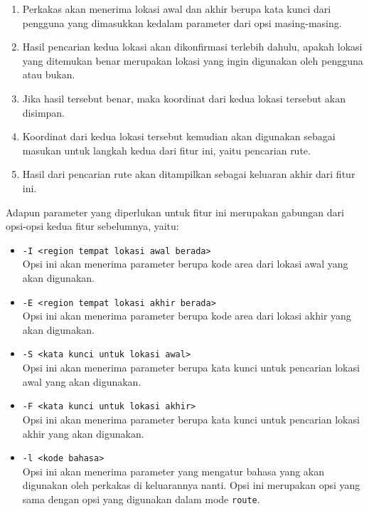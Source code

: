 \documentclass[a4paper,twoside]{article}
\begin{document}
\begin{enumerate}
\begin{itemize}
\begin{itemize}
		\begin{enumerate}
			\item Perkakas akan menerima lokasi awal dan akhir berupa kata kunci dari pengguna yang dimasukkan kedalam parameter dari opsi masing-masing.
			\item Hasil pencarian kedua lokasi akan dikonfirmasi terlebih dahulu, apakah lokasi yang ditemukan benar merupakan lokasi yang ingin digunakan oleh pengguna atau bukan.
			\item Jika hasil tersebut benar, maka koordinat \latlon dari kedua lokasi tersebut akan disimpan.
			\item Koordinat \latlon dari kedua lokasi tersebut kemudian akan digunakan sebagai masukan untuk langkah kedua dari fitur ini, yaitu pencarian rute.
			\item Hasil dari pencarian rute akan ditampilkan sebagai keluaran akhir dari fitur ini.
		\end{enumerate}
		\noindent
		Adapun parameter yang diperlukan untuk fitur ini merupakan gabungan dari opsi-opsi kedua fitur sebelumnya, yaitu:
		
		\begin{itemize}
			\item \verb|-I <region tempat lokasi awal berada>|\\
			Opsi ini akan menerima parameter berupa kode area dari lokasi awal yang akan digunakan.
			\item \verb|-E <region tempat lokasi akhir berada>|\\
			Opsi ini akan menerima parameter berupa kode area dari lokasi akhir yang akan digunakan.
			\item \verb|-S <kata kunci untuk lokasi awal>|\\
			Opsi ini akan menerima parameter berupa kata kunci untuk pencarian lokasi awal yang akan digunakan.
			\item \verb|-F <kata kunci untuk lokasi akhir>|\\
			Opsi ini akan menerima parameter berupa kata kunci untuk pencarian lokasi akhir yang akan digunakan.
			\item \verb|-l <kode bahasa>|\\
			Opsi ini akan menerima parameter yang mengatur bahasa yang akan digunakan oleh perkakas di keluarannya nanti. Opsi ini merupakan opsi yang sama dengan opsi yang digunakan dalam mode \verb|route|.
		\end{itemize}
		
	\end{itemize}
	

\end{itemize}
\end{enumerate}
\end{document}
